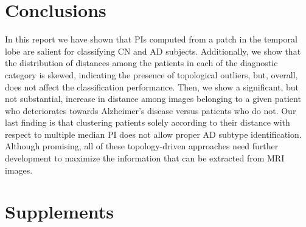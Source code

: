 \documentclass{article}
\begin{document}
\section{Conclusions}

In this report we have shown that PIs computed from a patch in the temporal lobe are salient for
classifying CN and AD subjects. Additionally, we show that the distribution of distances among the
patients in each of the diagnostic category is skewed, indicating the presence of topological
outliers, but, overall, does not affect the classification performance. Then, we show a significant,
but not substantial, increase in distance among images belonging to a given patient who deteriorates
towards Alzheimer's disease versus patients who do not. Our last finding is that clustering patients
solely according to their distance with respect to multiple median PI does not allow proper AD
subtype identification. Although promising, all of these topology-driven approaches need further
development to maximize the information that can be extracted from MRI images.

\clearpage
 

\clearpage
\appendix

\section{Supplements}
\end{document}
